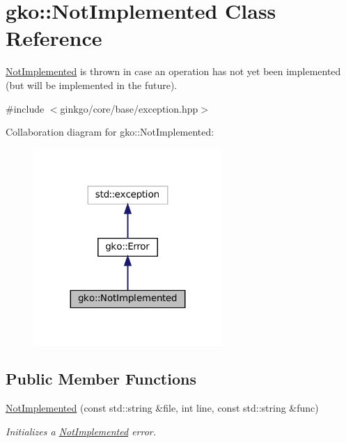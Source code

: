 \hypertarget{classgko_1_1NotImplemented}{}\section{gko\+:\+:Not\+Implemented Class Reference}
\label{classgko_1_1NotImplemented}


\hyperlink{classgko_1_1NotImplemented}{Not\+Implemented} is thrown in case an operation has not yet been implemented (but will be implemented in the future).  




{\ttfamily \#include $<$ginkgo/core/base/exception.\+hpp$>$}



Collaboration diagram for gko\+:\+:Not\+Implemented\+:
\nopagebreak
\begin{figure}[H]
\begin{center}
\leavevmode
\includegraphics[width=203pt]{classgko_1_1NotImplemented__coll__graph}
\end{center}
\end{figure}
\subsection*{Public Member Functions}
\begin{DoxyCompactItemize}
\item 
\hyperlink{classgko_1_1NotImplemented_a29f0b78ee5e0c2f71ddf38487a1fe5c2}{Not\+Implemented} (const std\+::string \&file, int line, const std\+::string \&func)
\begin{DoxyCompactList}\small\item\em Initializes a \hyperlink{classgko_1_1NotImplemented}{Not\+Implemented} error. \end{DoxyCompactList}\end{DoxyCompactItemize}


